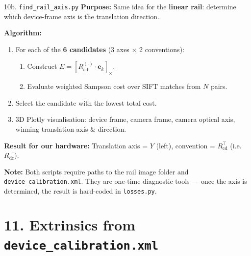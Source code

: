 \documentclass[aspectratio=169, 12pt]{beamer}
\newcommand{\Rcd}{R_{\mathrm{cd}}}
\newcommand{\Rdc}{R_{\mathrm{dc}}}
\begin{document}
\begin{frame}{10b. \texttt{find\_rail\_axis.py}}
\small
\textbf{Purpose:} Same idea for the \textbf{linear rail}: determine which
device-frame axis is the translation direction.

\medskip
\textbf{Algorithm:}
\begin{enumerate}\setlength{\itemsep}{2pt}
    \item For each of the \textbf{6 candidates} (3 axes $\times$ 2 conventions):
    \begin{enumerate}
        \item Construct $E = [\Rcd^{(\cdot)} \cdot \mathbf{e}_k]_\times$.
        \item Evaluate weighted Sampson cost over SIFT matches from $N$ pairs.
    \end{enumerate}
    \item Select the candidate with the lowest total cost.
    \item 3D Plotly visualisation: device frame, camera frame, camera optical axis,
          winning translation axis \& direction.
\end{enumerate}

\medskip
\textbf{Result for our hardware:}
Translation axis = $Y$ (left), convention = $\Rcd^\top$ (i.e.\ $\Rdc$).

\medskip
\textbf{Note:} Both scripts require paths to the rail image folder and
\texttt{device\_calibration.xml}. They are one-time diagnostic tools ---
once the axis is determined, the result is hard-coded in \texttt{losses.py}.
\end{frame}


\section{11. Extrinsics from \texttt{device\_calibration.xml}}
\end{document}
